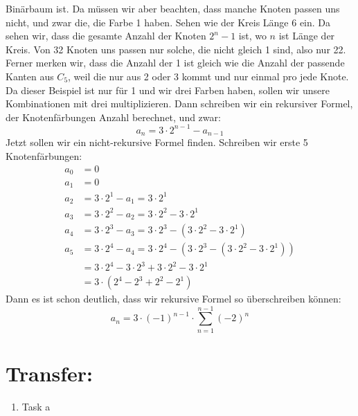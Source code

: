  
        Binärbaum ist. Da müssen wir aber beachten, dass manche Knoten passen uns nicht, und zwar die, 
        die Farbe 1 haben. Sehen wie der Kreis Länge 6 ein. Da sehen wir, dass die gesamte Anzahl der 
        Knoten $2^n-1$ ist, wo $n$ ist Länge der Kreis. Von 32 Knoten uns passen nur solche, die nicht 
        gleich 1 sind, also nur 22. Ferner merken wir, dass die Anzahl der 1 ist gleich wie die Anzahl 
        der passende Kanten aus $C_5$, weil die nur aus 2 oder 3 kommt und nur einmal pro jede Knote. 
        Da dieser Beispiel ist nur für 1 und wir drei Farben haben, sollen wir unsere Kombinationen 
        mit drei multiplizieren. Dann schreiben wir ein rekursiver Formel, der Knotenfärbungen Anzahl 
        berechnet, und zwar: $$ a_n = 3\cdot 2^{n-1} - a_{n-1} $$
        Jetzt sollen wir ein nicht-rekursive Formel finden. Schreiben wir erste 5 Knotenfärbungen:
        \begin{align*}
            a_0 &= 0\\
            a_1 &= 0\\
            a_2 &= 3\cdot 2^1 - a_1 = 3\cdot 2^1\\
            a_3 &= 3\cdot 2^2 - a_2 = 3\cdot 2^2 - 3\cdot 2^1\\
            a_4 &= 3\cdot 2^3 - a_3 = 3\cdot 2^3 - (3\cdot 2^2 - 3\cdot 2^1)\\
            a_5 &= 3\cdot 2^4 - a_4 = 3\cdot 2^4 - (3\cdot 2^3 - (3\cdot 2^2 - 3\cdot 2^1))\\
            &= 3\cdot 2^4 - 3\cdot 2^3 + 3\cdot 2^2 - 3\cdot 2^1\\
            &= 3\cdot (2^4 - 2^3 + 2^2 - 2^1)
        \end{align*} 
        Dann es ist schon deutlich, dass wir rekursive Formel so überschreiben können:
        $$ a_n = 3 \cdot (-1)^{n-1} \cdot \sum_{n=1}^{n-1}(-2)^n$$
    \section*{Transfer:}
    \begin{enumerate}[label=(\alph*)]
    	\item Task a
    \end{enumerate}
